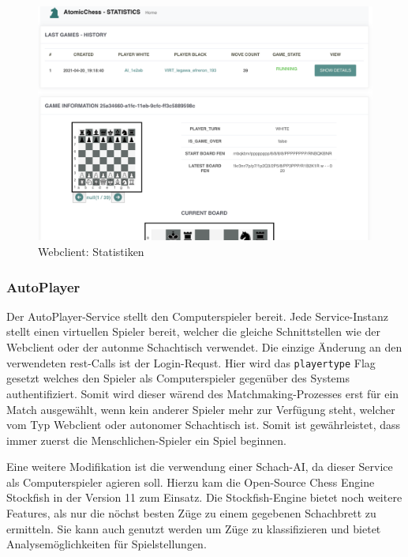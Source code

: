 \begin{figure}
\centering
\includegraphics{images/ATC_statistics.png}
\caption{Webclient: Statistiken \label{}}
\end{figure}

\hypertarget{autoplayer}{%
\subsubsection{AutoPlayer}\label{autoplayer}}

Der AutoPlayer-Service stellt den Computerspieler bereit. Jede
Service-Instanz stellt einen virtuellen Spieler bereit, welcher die
gleiche Schnittstellen wie der Webclient oder der autonme Schachtisch
verwendet. Die einzige Änderung an den verwendeten \gls{rest}-Calls ist
der Login-Requst. Hier wird das \passthrough{\lstinline!playertype!}
Flag gesetzt welches den Spieler als Computerspieler gegenüber des
Systems authentifiziert. Somit wird dieser wärend des
Matchmaking-Prozesses erst für ein Match ausgewählt, wenn kein anderer
Spieler mehr zur Verfügung steht, welcher vom Typ Webclient oder
autonomer Schachtisch ist. Somit ist gewährleistet, dass immer zuerst
die Menschlichen-Spieler ein Spiel beginnen.

Eine weitere Modifikation ist die verwendung einer Schach-AI, da dieser
Service als Computerspieler agieren soll. Hierzu kam die Open-Source
Chess Engine Stockfish\cite{stockfish} in der Version 11 zum
Einsatz. Die Stockfish-Engine bietet noch weitere Features, als nur die
nöchst besten Züge zu einem gegebenen Schachbrett zu ermitteln. Sie kann
auch genutzt werden um Züge zu klassifizieren und bietet
Analysemöglichkeiten für Spielstellungen.

